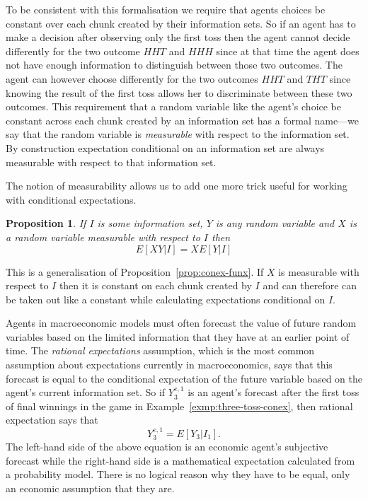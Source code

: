 \documentclass[11pt,reqno,openany]{amsbook}
\theoremstyle{plain}
\newtheorem{prop}{Proposition}[chapter]
\theoremstyle{definition}
\newcommand{\newterm}[1]{\emph{#1}}
\begin{document}
To be consistent with this formalisation we require that agents
choices be constant over each chunk created by their information sets.
So if an agent has to make a decision after observing only the first
toss then the agent cannot decide differently for the two outcome
$HHT$ and $HHH$ since at that time the agent does not have enough
information to distinguish between those two outcomes. The agent can
however choose differently for the two outcomes $HHT$ and $THT$ since
knowing the result of the first toss allows her to discriminate
between these two outcomes. This requirement that a random variable
like the agent's choice be constant across each chunk created by an
information set has a formal name---we say that the random variable is
\newterm{measurable} with respect to the information set. By
construction expectation conditional on an information set are always
measurable with respect to that information set.

The notion of measurability allows us to add one more trick useful for
working with conditional expectations. 

\begin{prop}\label{prop:conex-measure}
If $I$ is some information set,
$Y$ is any random variable and $X$ is a random variable measurable
with respect to $I$ then
\[E[XY|I]=XE[Y|I]\]
\end{prop}
This is a generalisation of Proposition~\ref{prop:conex-funx}. If $X$
is measurable with respect to $I$ then it is constant on each chunk
created by $I$ and can therefore can be taken out like a constant
while calculating expectations conditional on $I$.

Agents in macroeconomic models must often forecast the value of future
random variables based on the limited information that they have at an
earlier point of time. The \newterm{rational expectations} assumption,
which is the most common assumption about expectations currently in
macroeconomics, says that this forecast is equal to the conditional
expectation of the future variable based on the agent's current
information set. So if $Y_3^{e,1}$ is an agent's forecast after the
first toss of final
winnings in the game in Example~\ref{exmp:three-toss-conex},
then rational expectation says that
\[Y_3^{e,1}=E[Y_3|I_1].\]
The left-hand side of the above equation is an economic agent's
subjective forecast while the right-hand side is a mathematical
expectation calculated from a probability model. There is no logical
reason why they have to be equal, only an economic assumption that
they are.
\end{document}
